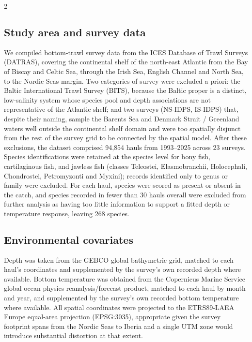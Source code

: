 \begin{spacing}{2}
\subsection{Study area and survey data}
We compiled bottom-trawl survey data from the ICES Database of Trawl Surveys (DATRAS), covering the continental shelf of the north-east Atlantic from the Bay of Biscay and Celtic Sea, through the Irish Sea, English Channel and North Sea, to the Nordic Seas margin. Two categories of survey were excluded a priori: the Baltic International Trawl Survey (BITS), because the Baltic proper is a distinct, low-salinity system whose species pool and depth associations are not representative of the Atlantic shelf; and two surveys (NS-IDPS, IS-IDPS) that, despite their naming, sample the Barents Sea and Denmark Strait / Greenland waters well outside the continental shelf domain and were too spatially disjunct from the rest of the survey grid to be connected by the spatial model. After these exclusions, the dataset comprised 94,854 hauls from 1993--2025 across 23 surveys. Species identifications were retained at the species level for bony fish, cartilaginous fish, and jawless fish (classes Teleostei, Elasmobranchii, Holocephali, Chondrostei, Petromyzonti and Myxini); records identified only to genus or family were excluded. For each haul, species were scored as present or absent in the catch, and species recorded in fewer than 30 hauls overall were excluded from further analysis as having too little information to support a fitted depth or temperature response, leaving 268 species.

\subsection{Environmental covariates}
Depth was taken from the GEBCO global bathymetric grid, matched to each haul's coordinates and supplemented by the survey's own recorded depth where available. Bottom temperature was obtained from the Copernicus Marine Service global ocean physics reanalysis/forecast product, matched to each haul by month and year, and supplemented by the survey's own recorded bottom temperature where available. All spatial coordinates were projected to the ETRS89-LAEA Europe equal-area projection (EPSG:3035), appropriate given the survey footprint spans from the Nordic Seas to Iberia and a single UTM zone would introduce substantial distortion at that extent.


\end{spacing}

